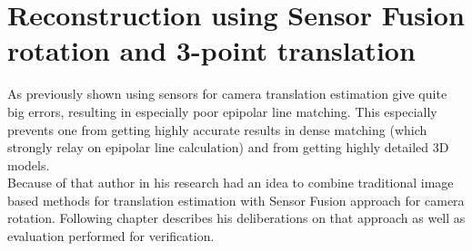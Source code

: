 \ifpdf
    \graphicspath{{figures/}{figures/comparisons}}
\else
    \graphicspath{{figures/}{figures/comparisons}}
\fi

\chapter{Reconstruction using Sensor Fusion rotation and 3-point translation}
As previously shown using sensors for camera translation estimation give quite big errors, resulting in especially poor epipolar line matching. This especially prevents one from getting highly accurate results in dense matching (which strongly relay on epipolar line calculation) and from getting highly detailed 3D models. \\
Because of that author in his research had an idea to combine traditional image based methods for translation estimation with Sensor Fusion approach for camera rotation. Following chapter describes his deliberations on that approach as well as evaluation performed for verification.
